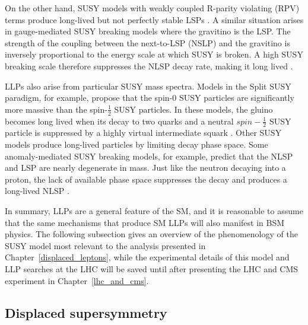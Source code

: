 On the other hand, SUSY models with weakly coupled R-parity violating (RPV) terms produce long-lived but not perfectly stable LSPs . A similar situation arises in gauge-mediated SUSY breaking models where the gravitino is the LSP. The strength of the coupling between the next-to-LSP (NSLP) and the gravitino is inversely proportional to the energy scale at which SUSY is broken. A high SUSY breaking scale therefore suppresses the NLSP decay rate, making it long lived .

LLPs also arise from particular SUSY mass spectra. Models in the Split SUSY paradigm, for example, propose that the spin-0 SUSY particles are significantly more massive than the spin-$\frac{1}{2}$ SUSY particles. In these models, the gluino becomes long lived when its decay to two quarks and a neutral $spin-\frac{1}{2}$ SUSY particle is suppressed by a highly virtual intermediate squark . Other SUSY models produce long-lived particles by limiting decay phase space. Some anomaly-mediated SUSY breaking models, for example, predict that the NLSP and LSP are nearly degenerate in mass. Just like the neutron decaying into a proton, the lack of available phase space suppresses the decay and produces a long-lived NLSP .

In summary, LLPs are a general feature of the SM, and it is reasonable to assume that the same mechanisms that produce SM LLPs will also manifest in BSM physics. The following subsection gives an overview of the phenomenology of the SUSY model most relevant to the analysis presented in Chapter~\ref{displaced_leptons}, while the experimental details of this model and LLP searches at the LHC will be saved until after presenting the LHC and CMS experiment in Chapter~\ref{lhc_and_cms}.

\subsection{Displaced supersymmetry}

% 